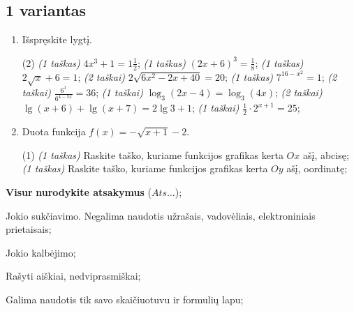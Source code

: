 \documentclass[a4paper]{article}
\begin{document}
\vspace*{12mm}
\subsection*{1 variantas}
\begin{enumerate}
      \item Išspręskite lygtį.

            \begin{tasks}[item-format={\normalfont}, after-item-skip=2mm](2)
                  \task \textit{(1 taškas)} $4x^3+1=1\frac{1}{2}$;
                  \task \textit{(1 taškas)} $(2x+6)^3=\frac{1}{8}$;
                  \task \textit{(1 taškas)} $2\sqrt{x}+6=1$;
                  \task \textit{(2 taškai)} $2\sqrt{6x^2-2x+40}=20$;
                  \task \textit{(1 taškas)} $7^{16-x^2}=1$;
                  \task \textit{(2 taškai)} $\frac{6^x}{6^{4-5x}}=36$;
                  \task \textit{(1 taškai)} $\log_3(2x-4)=\log_3(4x)$;
                  \task \textit{(2 taškai)} $\lg(x+6)+\lg(x+7)=2\lg3+1$;
                  \task \textit{(1 taškai)} $\frac{1}{2}\cdot 2^{x+1}=25$;
            \end{tasks}

      \item Duota funkcija $f(x)=-\sqrt{x+1}-2$.
            \begin{tasks}[item-format={\normalfont}, after-item-skip=2mm](1)
                  \task \textit{(1 taškas)} Raskite taško, kuriame funkcijos grafikas kerta $Ox$ ašį, abcisę;
                  \task \textit{(1 taškas)} Raskite taško, kuriame funkcijos grafikas kerta $Oy$ ašį, oordinatę;
            \end{tasks}
\end{enumerate}

\begin{small}
      \begin{enumerate*}[label={(\arabic*)}]
            \item \textbf{Visur} \textbf{nurodykite atsakymus} ($Ats\ldots$);
            \item Jokio sukčiavimo. Negalima naudotis užrašais, vadovėliais,
            elektroniniais prietaisais;
            \item Jokio kalbėjimo;
            \item Rašyti aiškiai, nedviprasmiškai;
            \item Galima naudotis tik savo skaičiuotuvu ir formulių lapu;
      \end{enumerate*}
\end{small}
\end{document}
